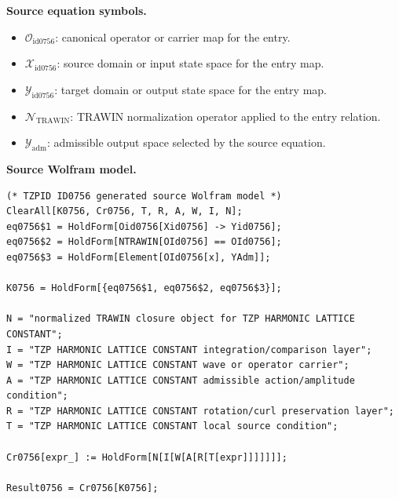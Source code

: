 \begin{minipage}[t]{0.49\linewidth}
\begingroup
\small
\raggedright
\textbf{Source equation symbols.}\par
\begin{itemize}[leftmargin=1.35em,itemsep=1pt,topsep=1pt,parsep=0pt]
    \item $\mathcal{O}_{\mathrm{id0756}}$: canonical operator or carrier map for the entry.
    \item $\mathcal{X}_{\mathrm{id0756}}$: source domain or input state space for the entry map.
    \item $\mathcal{Y}_{\mathrm{id0756}}$: target domain or output state space for the entry map.
    \item $\mathcal{N}_{\mathrm{TRAWIN}}$: TRAWIN normalization operator applied to the entry relation.
    \item $\mathcal{Y}_{\mathrm{adm}}$: admissible output space selected by the source equation.
\end{itemize}
\endgroup
\end{minipage}\hfill
\begin{minipage}[t]{0.47\linewidth}
\begingroup
\scriptsize
\raggedright
\textbf{Source Wolfram model.}\par
\begin{Verbatim}[fontsize=\tiny,breaklines=true,breakanywhere=true]
(* TZPID ID0756 generated source Wolfram model *)
ClearAll[K0756, Cr0756, T, R, A, W, I, N];
eq0756$1 = HoldForm[Oid0756[Xid0756] -> Yid0756];
eq0756$2 = HoldForm[NTRAWIN[OId0756] == OId0756];
eq0756$3 = HoldForm[Element[OId0756[x], YAdm]];

K0756 = HoldForm[{eq0756$1, eq0756$2, eq0756$3}];

N = "normalized TRAWIN closure object for TZP HARMONIC LATTICE CONSTANT";
I = "TZP HARMONIC LATTICE CONSTANT integration/comparison layer";
W = "TZP HARMONIC LATTICE CONSTANT wave or operator carrier";
A = "TZP HARMONIC LATTICE CONSTANT admissible action/amplitude condition";
R = "TZP HARMONIC LATTICE CONSTANT rotation/curl preservation layer";
T = "TZP HARMONIC LATTICE CONSTANT local source condition";

Cr0756[expr_] := HoldForm[N[I[W[A[R[T[expr]]]]]]];

Result0756 = Cr0756[K0756];
\end{Verbatim}
\endgroup
\end{minipage}

